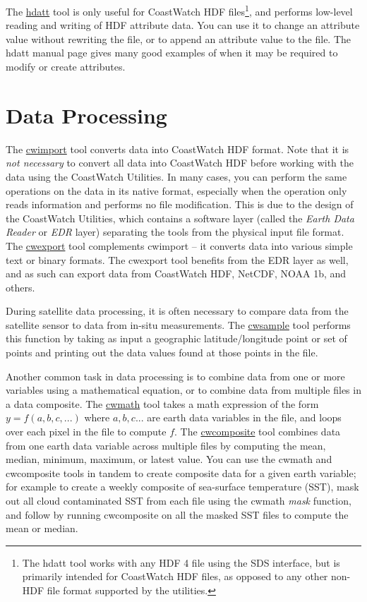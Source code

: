 The \hyperlink{hdatt}{hdatt} tool is only useful for CoastWatch HDF
files\footnote{The hdatt tool works with any HDF 4 file using the
SDS interface, but is primarily intended for CoastWatch HDF files,
as opposed to any other non-HDF file format
supported by the utilities.}, and performs low-level reading and
writing of HDF attribute data.  You can use it to change an attribute
value without rewriting the file, or to append an attribute value
to the file.  The hdatt manual page gives many good examples of
when it may be required to modify or create attributes.

\section{Data Processing}
\label{processing}

The \hyperlink{cwimport}{cwimport} tool converts data into CoastWatch
HDF format.  Note that it is {\em not necessary} to convert all
data into CoastWatch HDF before working with the data using the
CoastWatch Utilities.  In many cases, you can perform the same
operations on the data in its native format, especially when the
operation only reads information and performs no file modification.
This is due to the design of the CoastWatch Utilities, which contains
a software layer (called the {\em Earth Data Reader} or {\em EDR}
layer) separating the tools from the physical input file format.
The \hyperlink{cwexport}{cwexport} tool complements cwimport -- it
converts data into various simple text or binary formats.  The
cwexport tool benefits from the EDR layer as well, and as such can
export data from CoastWatch HDF, NetCDF, NOAA 1b, and
others.

During satellite data processing, it is often necessary to compare data
from the satellite sensor to data from in-situ measurements.  The
\hyperlink{cwsample}{cwsample} tool performs this function by taking
as input a geographic latitude/longitude point or set of points and
printing out the data values found at those points in the file.

Another common task in data processing is to combine data from one
or more variables using a mathematical equation, or to combine data
from multiple files in a data composite.  The \hyperlink{cwmath}{cwmath}
tool takes a math expression of the form $y = f(a,b,c,...)$ where
$a,b,c...$ are earth data variables in the file, and loops over
each pixel in the file to compute $f$.  The
\hyperlink{cwcomposite}{cwcomposite} tool combines data from one
earth data variable across multiple files by computing the mean,
median, minimum, maximum, or latest value.  You can use the cwmath
and cwcomposite tools in tandem to create composite data for a given
earth variable; for example to create a weekly composite of sea-surface
temperature (SST), mask out all cloud contaminated SST from each
file using the cwmath {\em mask} function, and follow by running
cwcomposite on all the masked SST files to compute the mean or
median.

